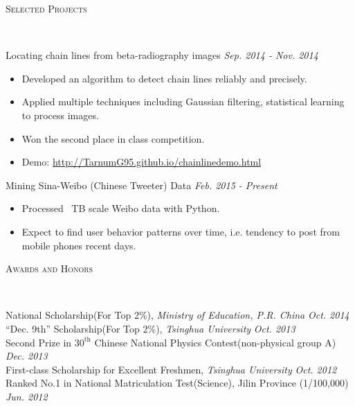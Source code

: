 \documentclass[9pt]{article}
\newenvironment{changemargin}[2]{%
  \begin{list}{}{%
    \setlength{\topsep}{0pt}%
    \setlength{\leftmargin}{#1}%
    \setlength{\rightmargin}{#2}%
    \setlength{\listparindent}{\parindent}%
    \setlength{\itemindent}{\parindent}%
    \setlength{\parsep}{\parskip}%
  }%
  \item[]}{\end{list}
}
\newcommand{\lineover}{
	\begin{changemargin}{-0.05in}{-0.05in}
		\vspace*{-8pt}
		\hrulefill \\
		\vspace*{-2pt}
	\end{changemargin}
}
\newcommand{\header}[1]{
	\begin{changemargin}{-0.5in}{-0.5in}
		\scshape{#1}\\
  	\lineover
	\end{changemargin}
}
\newenvironment{body} {
	\vspace*{-16pt}
	\begin{changemargin}{-0.25in}{-0.5in}
  }	
	{\end{changemargin}
}
\begin{document}
\header{Selected Projects}

\begin{body}
	\vspace{14pt}
	Locating chain lines from beta-radiography images \hfill \emph{Sep. 2014 - Nov. 2014}
	\begin{itemize}
	\itemsep 0pt
	\item Developed an algorithm to detect chain lines reliably and precisely. 
	\item Applied multiple techniques including Gaussian filtering, statistical learning to process images. 
	\item Won the second place in class competition. 
	\item Demo: \href{http://TarnumG95.github.io/chainlinedemo.html}{http://TarnumG95.github.io/chainlinedemo.html}
	\end{itemize}
	\smallskip
	Mining Sina-Weibo (Chinese Tweeter) Data \hfill \emph{Feb. 2015 - Present}
	\begin{itemize}
	\itemsep 0pt
	\item Processed ~TB scale Weibo data with Python. 
	\item Expect to find user behavior patterns over time, i.e. tendency to post from mobile phones recent days. 
	\end{itemize}
	\smallskip

\end{body}
\smallskip
\smallskip

\header{Awards and Honors}

\begin{body}
	\vspace{14pt}
	National Scholarship(For Top 2\%), \emph{Ministry of Education, P.R. China} \hfill{} \emph{Oct. 2014}\\
	\smallskip
	``Dec. 9th'' Scholarship(For Top 2\%), \emph{Tsinghua University} \hfill{} \emph{Oct. 2013}\\
	\smallskip
	Second Prize in $30^{\mathrm{th}}$ Chinese National Physics Contest(non-physical group A) \hfill{} \emph{Dec. 2013}\\
	\smallskip
	First-class Scholarship for Excellent Freshmen, \emph{Tsinghua University} \hfill{} \emph{Oct. 2012}\\
	\smallskip
	Ranked No.1 in National Matriculation Test(Science), Jilin Province (1/100,000) \hfill{} \emph{Jun. 2012}
\end{body}
\end{document}
